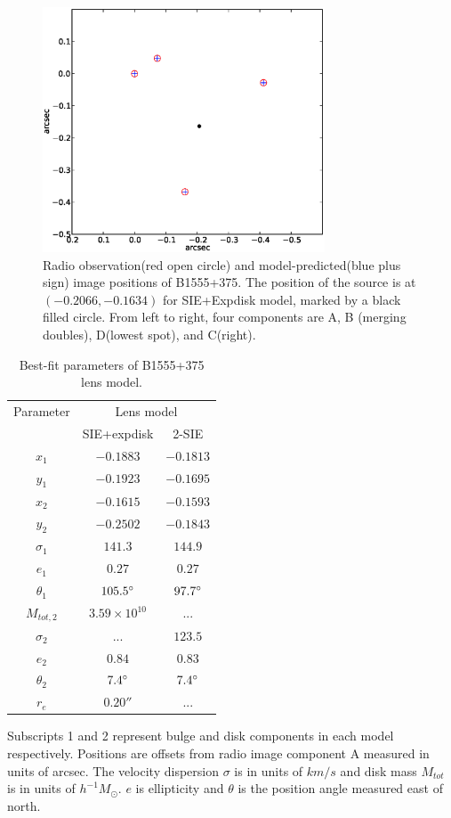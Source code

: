 \documentclass[useAMS,usenatbib]{mn2e}
\begin{document}
\begin{figure}
\includegraphics[width=84mm]{point_source.eps}
\caption{Radio observation(red open circle) and model-predicted(blue plus sign) image positions of B1555+375. The position of the source is at $(-0.2066,-0.1634)$ for SIE+Expdisk model, marked by a black filled circle. From left to right, four components are A, B (merging doubles), D(lowest spot), and C(right).\label{fig2}}
\end{figure}



\begin{table}
  \caption{Best-fit parameters of B1555+375 lens model.}
  \begin{tabular}{@{}ccc}
\hline 
 Parameter  & \multicolumn{2}{c}{Lens model} \\
		&SIE+expdisk& 2-SIE		   
\\
\hline
$x_1$  	  & $-0.1883$	& $-0.1813$  \\
$y_1$	  &$-0.1923$	&$-0.1695$  \\
$x_2$	  &$-0.1615$ 	&$-0.1593$  \\
$y_2$	  &$-0.2502$	& $-0.1843$  \\
$\sigma_1$ &$141.3$     & $144.9$ \\
$e_1$	  & $0.27$	& $0.27$ \\
$\theta_1$ &$105.5 \hbox{$^\circ$}$ & $97.7 \hbox{$^\circ$}$ \\
$M_{tot,2}$  & $3.59\times 10^{10} $  & ...	 \\  
$\sigma_2$ & ...        &$123.5$ \\  
$e_2$	  &$0.84$	&$0.83$  \\
$\theta_2$ &$7.4\hbox{$^\circ$}$ &$7.4\hbox{$^\circ$}$  \\
$r_e$	  & $0.20 ''$ &  ... \\
\hline
\end{tabular}

\medskip
Subscripts 1 and 2 represent bulge and disk components in each model respectively. Positions are offsets from radio image component A measured in units of arcsec. The velocity dispersion $\sigma$ is in units of $km/s$ and disk mass $M_{tot}$ is in units of $h^{-1} M_{\odot}$. $e$ is ellipticity and $\theta$ is the position angle measured east of north.

\end{table}
\end{document}
